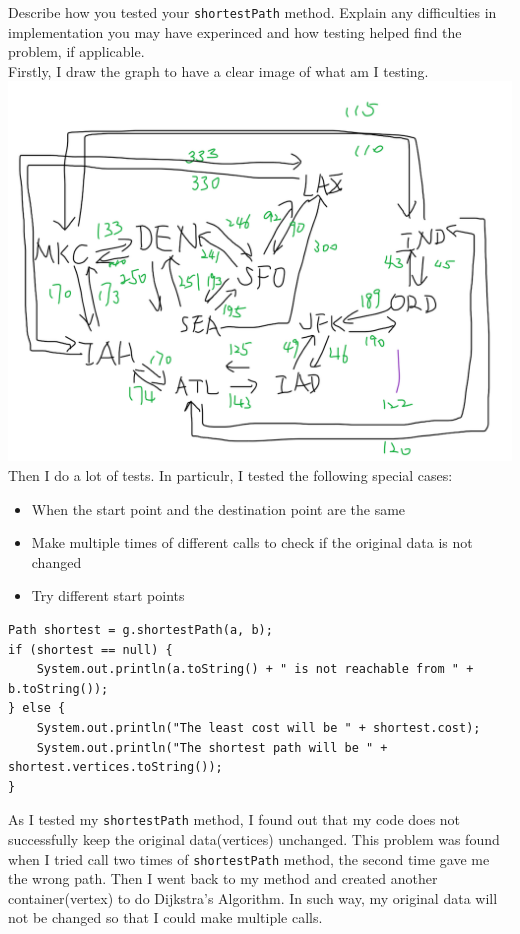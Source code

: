 \documentclass[]{exam}
\begin{document}
\begin{questions}
\question Describe how you tested your \verb|shortestPath| method. Explain any difficulties in implementation you may have experinced and how testing helped find the problem, if applicable.
\\ Firstly, I draw the graph to have a clear image of what am I testing. 
\\ \includegraphics[scale = 0.3]{Dij.png}
\\ Then I do a lot of tests. In particulr, I tested the following special cases:
\begin{itemize}
	\item When the start point and the destination point are the same
	\item Make multiple times of different calls to check if the original data is not changed
	\item Try different start points
\end{itemize}
\begin{Verbatim}
Path shortest = g.shortestPath(a, b);
if (shortest == null) {
	System.out.println(a.toString() + " is not reachable from " + b.toString());
} else {
	System.out.println("The least cost will be " + shortest.cost);
	System.out.println("The shortest path will be " + shortest.vertices.toString());
}
\end{Verbatim}
As I tested my \verb|shortestPath| method, I found out that my code does not successfully keep the original data(vertices) unchanged. This problem was found when I tried call two times of \verb|shortestPath| method, the second time gave me the wrong path. Then I went back to my method and created another container(vertex) to do Dijkstra's Algorithm. In such way, my original data will not be changed so that I could make multiple calls.


\end{questions}
\end{document}
